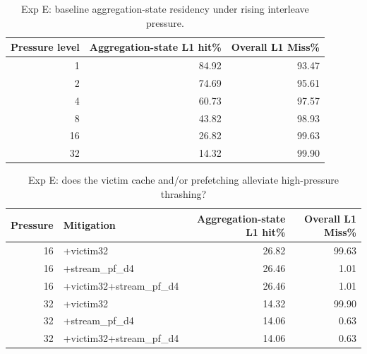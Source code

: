 \begin{table}[H]\centering\small
\begin{tabular}{rrr}\toprule
Pressure level & Aggregation-state L1 hit\% & Overall L1 Miss\% \\ \midrule
1 & 84.92 & 93.47 \\
2 & 74.69 & 95.61 \\
4 & 60.73 & 97.57 \\
8 & 43.82 & 98.93 \\
16 & 26.82 & 99.63 \\
32 & 14.32 & 99.90 \\
\bottomrule\end{tabular}
\caption{Exp E: baseline aggregation-state residency under rising interleave pressure.}
\label{tab:expE-baseline}\end{table}

\begin{table}[H]\centering\small
\begin{tabular}{rlrr}\toprule
Pressure & Mitigation & Aggregation-state L1 hit\% & Overall L1 Miss\% \\ \midrule
16 & +victim32 & 26.82 & 99.63 \\
16 & +stream\_pf\_d4 & 26.46 & 1.01 \\
16 & +victim32+stream\_pf\_d4 & 26.46 & 1.01 \\
32 & +victim32 & 14.32 & 99.90 \\
32 & +stream\_pf\_d4 & 14.06 & 0.63 \\
32 & +victim32+stream\_pf\_d4 & 14.06 & 0.63 \\
\bottomrule\end{tabular}
\caption{Exp E: does the victim cache and/or prefetching alleviate high-pressure thrashing?}
\label{tab:expE-mitigation}\end{table}


